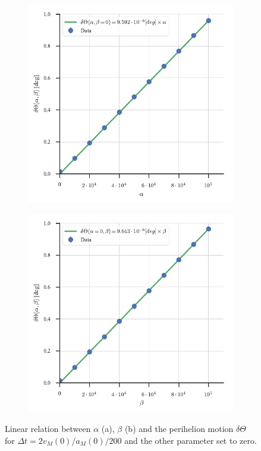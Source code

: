 \documentclass[12pt,ngerman,american]{iopart}
\begin{document}
\begin{figure}[htb]
	\centering
	\begin{subfigure}[c]{0.49\textwidth}
		\includegraphics[width=\textwidth]{figs/alpha-angle.pdf}
		\caption{\label{fig:angle-alpha}}
	\end{subfigure}
	\begin{subfigure}[c]{0.49\textwidth}
		\includegraphics[width=\textwidth]{figs/beta-angle.pdf}
		\caption{\label{fig:beta-alpha}}
	\end{subfigure}
	\caption{\label{fig:AlphaAngle} Linear relation between $\alpha$ (a), $\beta$ (b) and the perihelion motion $\delta \Theta$ for $\Delta t=2v_M(0)/a_M(0)/200$ and the other parameter set to zero.}
\end{figure}
\end{document}
